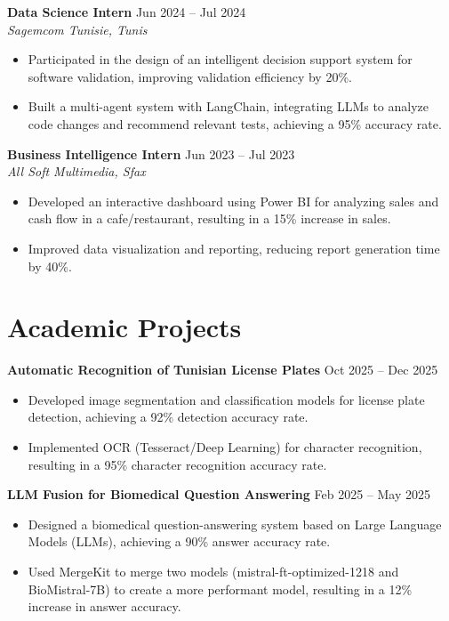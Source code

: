 \documentclass[9pt]{article}
\begin{document}
\textbf{Data Science Intern} \hfill Jun 2024 -- Jul 2024 \\
\textit{\small Sagemcom Tunisie, Tunis} \vspace{-2mm}
\begin{itemize}[itemsep=-0.2em] 
    \item Participated in the design of an intelligent decision support system for software validation, improving validation efficiency by 20\%.
    \item Built a multi-agent system with LangChain, integrating LLMs to analyze code changes and recommend relevant tests, achieving a 95\% accuracy rate.
\end{itemize}
\vspace{1mm}

\textbf{Business Intelligence Intern} \hfill Jun 2023 -- Jul 2023 \\
\textit{\small All Soft Multimedia, Sfax} \vspace{-2mm}
\begin{itemize}[itemsep=-0.2em] 
    \item Developed an interactive dashboard using Power BI for analyzing sales and cash flow in a cafe/restaurant, resulting in a 15\% increase in sales.
    \item Improved data visualization and reporting, reducing report generation time by 40\%.
\end{itemize}

\section*{Academic Projects}
\textbf{Automatic Recognition of Tunisian License Plates} \hfill Oct 2025 -- Dec 2025
\begin{itemize}[itemsep=-0.2em]
    \item Developed image segmentation and classification models for license plate detection, achieving a 92\% detection accuracy rate.
    \item Implemented OCR (Tesseract/Deep Learning) for character recognition, resulting in a 95\% character recognition accuracy rate.
\end{itemize}

\textbf{LLM Fusion for Biomedical Question Answering} \hfill Feb 2025 -- May 2025
\begin{itemize}[itemsep=-0.2em]
    \item Designed a biomedical question-answering system based on Large Language Models (LLMs), achieving a 90\% answer accuracy rate.
    \item Used MergeKit to merge two models (mistral-ft-optimized-1218 and BioMistral-7B) to create a more performant model, resulting in a 12\% increase in answer accuracy.
\end{itemize}
\end{document}
